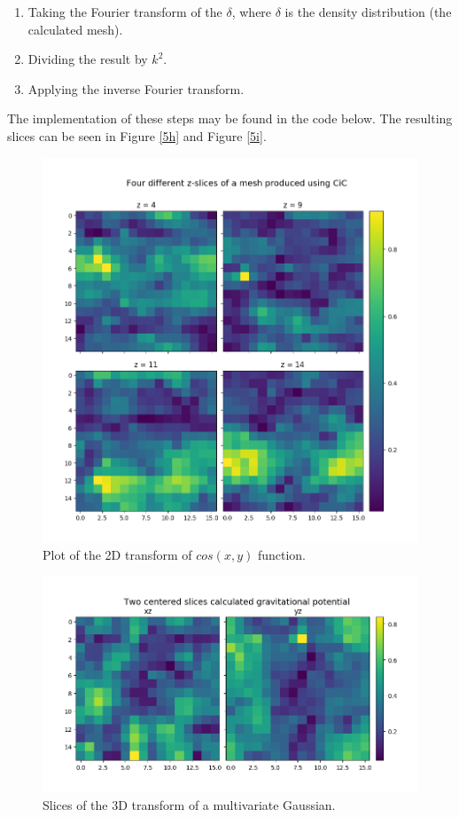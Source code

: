 \documentclass[a4paper,10pt]{article}
\begin{document}
\begin{enumerate}
	\item Taking the Fourier transform of the $\delta$, where $\delta$ is the density distribution (the calculated mesh). 
	\item Dividing the result by $k^2$. 
	\item Applying the inverse Fourier transform.  
\end{enumerate}

The implementation of these steps may be found in the code below. The resulting slices can be seen in Figure \ref{5h} and Figure \ref{5i}. 

\begin{figure}[h!]
  \centering
  \includegraphics[width=0.7\linewidth]{./plots/5h.png}
  \caption{Plot of the 2D transform of $cos(x,y)$ function.}
  \label{fig:5h}
\end{figure}

\begin{figure}[h!]
  \centering
  \includegraphics[width=0.7\linewidth]{./plots/5i.png}
  \caption{Slices of the 3D transform of a multivariate Gaussian.}
  \label{fig:5i}
\end{figure}
\end{document}
